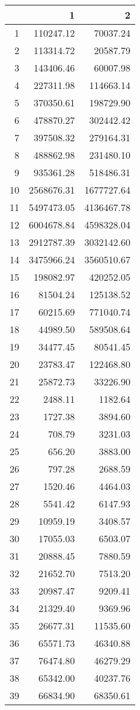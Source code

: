 \begin{table}[ht]
\centering
\begin{tabular}{rrr}
  \hline
 & 1 & 2 \\ 
  \hline
1 & 110247.12 & 70037.24 \\ 
  2 & 113314.72 & 20587.79 \\ 
  3 & 143406.46 & 60007.98 \\ 
  4 & 227311.98 & 114663.14 \\ 
  5 & 370350.61 & 198729.90 \\ 
  6 & 478870.27 & 302442.42 \\ 
  7 & 397508.32 & 279164.31 \\ 
  8 & 488862.98 & 231480.10 \\ 
  9 & 935361.28 & 518486.31 \\ 
  10 & 2568676.31 & 1677727.64 \\ 
  11 & 5497473.05 & 4136467.78 \\ 
  12 & 6004678.84 & 4598328.04 \\ 
  13 & 2912787.39 & 3032142.60 \\ 
  14 & 3475966.24 & 3560510.67 \\ 
  15 & 198082.97 & 420252.05 \\ 
  16 & 81504.24 & 125138.52 \\ 
  17 & 60215.69 & 771040.74 \\ 
  18 & 44989.50 & 589508.64 \\ 
  19 & 34477.45 & 80541.45 \\ 
  20 & 23783.47 & 122468.80 \\ 
  21 & 25872.73 & 33226.90 \\ 
  22 & 2488.11 & 1182.64 \\ 
  23 & 1727.38 & 3894.60 \\ 
  24 & 708.79 & 3231.03 \\ 
  25 & 656.20 & 3883.00 \\ 
  26 & 797.28 & 2688.59 \\ 
  27 & 1520.46 & 4464.03 \\ 
  28 & 5541.42 & 6147.93 \\ 
  29 & 10959.19 & 3408.57 \\ 
  30 & 17055.03 & 6503.07 \\ 
  31 & 20888.45 & 7880.59 \\ 
  32 & 21652.70 & 7513.20 \\ 
  33 & 20987.47 & 9209.41 \\ 
  34 & 21329.40 & 9369.96 \\ 
  35 & 26677.31 & 11535.60 \\ 
  36 & 65571.73 & 46340.88 \\ 
  37 & 76474.80 & 46279.29 \\ 
  38 & 65342.00 & 40237.76 \\ 
  39 & 66834.90 & 68350.61 \\ 
   \hline
\end{tabular}
\end{table}
